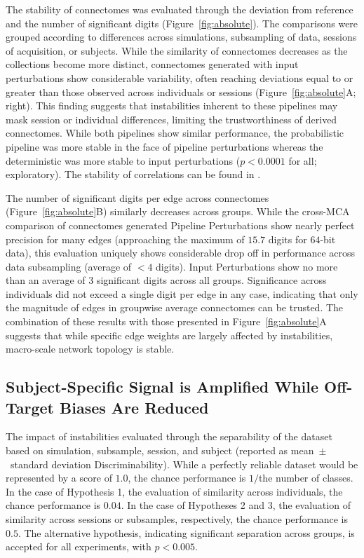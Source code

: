 \documentclass[fleqn,10pt]{SelfArx} %
\begin{document}
The stability of connectomes was evaluated through the deviation from reference and the number of significant digits
(Figure~\ref{fig:absolute}). The comparisons were grouped according to differences across simulations, subsampling
of data, sessions of acquisition, or subjects. While the similarity of connectomes decreases as the collections become
more distinct, connectomes generated with input perturbations show considerable variability, often reaching deviations
equal to or greater than those observed across individuals or sessions (Figure~\ref{fig:absolute}A; right). This
finding suggests that instabilities inherent to these pipelines may mask session or individual differences, limiting
the trustworthiness of derived connectomes. While both pipelines show similar performance, the probabilistic pipeline
was more stable in the face of pipeline perturbations whereas the deterministic was more stable to input perturbations
($p < 0.0001$ for all; exploratory). The stability of correlations can be found in .

The number of significant digits per edge across connectomes (Figure~\ref{fig:absolute}B) similarly decreases across
groups. While the cross-MCA comparison of connectomes generated Pipeline Perturbations show nearly perfect precision
for many edges (approaching the maximum of $15.7$ digits for $64$-bit data), this evaluation uniquely shows
considerable drop off in performance across data subsampling (average of $< 4$ digits). Input Perturbations show no
more than an average of $3$ significant digits across all groups. Significance across individuals did not exceed a
single digit per edge in any case, indicating that only the magnitude of edges in groupwise average connectomes can be
trusted. The combination of these results with those presented in Figure~\ref{fig:absolute}A suggests that while
specific edge weights are largely affected by instabilities, macro-scale network topology is stable.

\subsection*{Subject-Specific Signal is Amplified While Off-Target Biases Are Reduced}
\begin{table}[ht]\centering
\caption{The impact of instabilities evaluated through the separability of the dataset based on simulation, subsample,
session, and subject (reported as mean~$\pm$~standard deviation Discriminability). While a perfectly reliable dataset
would be represented by a score of $1.0$, the chance performance is $1 /$the number of classes. In the case of
Hypothesis 1, the evaluation of similarity across individuals, the chance performance is $0.04$. In the case of
Hypotheses 2 and 3, the evaluation of similarity across sessions or subsamples, respectively, the chance performance is
$0.5$. The alternative hypothesis, indicating significant separation across groups, is accepted for all experiments,
with $p < 0.005$.}
\vspace{5pt}

\label{tab:discrim}
\end{table}
\end{document}
